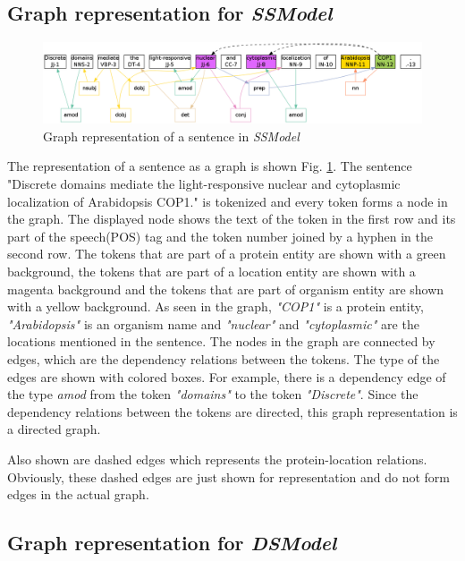 \subsection{Graph representation for \textit{SSModel}}\label{sec:graphSSModel}

\begin{figure}
\centering
\includegraphics[scale=0.3]{figures/SameSentenceGraph.png}
\caption{Graph representation of a sentence in \textit{SSModel}}\label{fig:SSGraph}
\end{figure}

The representation of a sentence as a graph is shown Fig. \ref{fig:SSGraph}. The sentence "Discrete domains mediate the light-responsive nuclear and cytoplasmic localization of Arabidopsis COP1." is tokenized and every token forms a node in the graph. The displayed node shows the text of the token in the first row and its part of the speech(POS) tag and the token number joined by a hyphen in the second row. The tokens that are part of a protein entity are shown with a green background, the tokens that are part of a location entity are shown with a magenta background and the tokens that are part of organism entity are shown with a yellow  background. As seen in the graph, \textit{"COP1"} is a protein entity, \textit{"Arabidopsis"} is an organism name and \textit{"nuclear"} and \textit{"cytoplasmic"} are the locations mentioned in the sentence. The nodes in the graph are connected by edges, which are the dependency
 relations between the tokens. The type of the edges are shown with colored boxes. For example, there is a dependency edge of the type \textit{amod} from the token \textit{"domains"}  to  the token \textit{"Discrete"}. Since the dependency relations between the tokens are directed, this graph representation is a directed graph.

Also shown are dashed edges which represents the protein-location relations. Obviously, these dashed edges are just shown for representation and do not form edges in the actual graph.

\subsection{Graph representation for \textit{DSModel}}\label{sec:graphDSModel}

